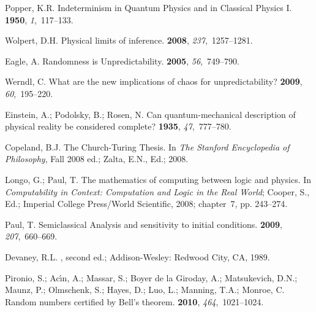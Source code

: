 \documentclass[information,article,submit,moreauthors,pdftex,12pt,a4paper]{mdpi}
\theoremstyle{mdpi}
\newcounter{ex}
\newcounter{re}
\theoremstyle{mdpidefinition}
\begin{document}
\begin{thebibliography}{-------}
Popper, K.R.
\newblock Indeterminism in Quantum Physics and in Classical Physics {I}.
 {\bf 1950},
  {\em 1},~117--133.

Wolpert, D.H.
\newblock Physical limits of inference.
 {\bf 2008}, {\em 237},~1257--1281.

Eagle, A.
\newblock Randomness is Unpredictability.
 {\bf 2005}, {\em
  56},~749--790.

Werndl, C.
\newblock What are the new implications of chaos for unpredictability?
 {\bf 2009}, {\em
  60},~195--220.

Einstein, A.; Podolsky, B.; Rosen, N.
\newblock Can quantum-mechanical description of physical reality be considered
  complete?
 {\bf 1935}, {\em 47},~777--780.

Copeland, B.J.
\newblock The Church-Turing Thesis. In {\em The Stanford Encyclopedia of
  Philosophy}, Fall 2008 ed.;  Zalta, E.N., Ed.;  2008.

Longo, G.; Paul, T.
\newblock The mathematics of computing between logic and physics. In {\em
  Computability in Context: Computation and Logic in the Real World}; Cooper,
  S., Ed.; Imperial College Press/World Scientific,  2008; chapter~7, pp.
  243--274.

Paul, T.
\newblock Semiclassical Analysis and sensitivity to initial conditions.
 {\bf 2009}, {\em 207},~660--669.

Devaney, R.L.
, second ed.;
  Addison-Wesley: Redwood City, CA,  1989.

Pironio, S.; Ac{\'\i}n, A.; Massar, S.; {Boyer de la Giroday}, A.; Matsukevich,
  D.N.; Maunz, P.; Olmschenk, S.; Hayes, D.; Luo, L.; Manning, T.A.; Monroe, C.
\newblock Random numbers certified by {B}ell's theorem.
 {\bf 2010}, {\em 464},~1021--1024.


\end{thebibliography}
\end{document}
